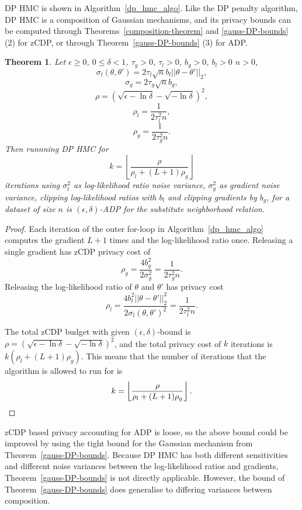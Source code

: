 \documentclass[english,twoside,openright]{HYgraduMLDS}
\newtheorem{theorem}[lemma]{Theorem}
\begin{document}
DP HMC is shown in Algorithm~\ref{dp_hmc_algo}.
Like the DP penalty algorithm, DP HMC is a composition of Gaussian mechanisms,
and its privacy bounds can be computed through Theorems~\ref{composition-theorem}
and \ref{gauss-DP-bounds} (2) for zCDP, or through Theorem~\ref{gauss-DP-bounds} (3)
for ADP.

\begin{theorem}\label{dp_hmc_theorem_zcdp}
  Let \(\epsilon \geq 0\), \(0 \leq \delta < 1\), \(\tau_{g} > 0\), \(\tau_{l} > 0\),
  \(b_{g} > 0\), \(b_{l} > 0\) \(n > 0\),
  \[\sigma_l(\theta, \theta') = 2\tau_l\sqrt{n}b_l||\theta - \theta'||_2,\]
  \[\sigma_g = 2\tau_g\sqrt{n}b_g,\]
  \[
    \rho = \left(\sqrt{\epsilon - \ln \delta} - \sqrt{-\ln \delta}\right)^2,
  \]
  \[
    \rho_l = \frac{1}{2\tau_l^2n},
  \]
  \[
    \rho_g = \frac{1}{2\tau_g^2n}.
  \]
  Then runnning DP HMC for
  \[
    k = \left\lfloor\frac{\rho}{\rho_l + (L + 1)\rho_g}\right\rfloor
  \]
  iterations using \(\sigma_{l}^{2}\) as log-likelihood ratio noise variance,
  \(\sigma_{g}^{2}\) as gradient noise variance, clipping log-likelihood ratios
  with \(b_{l}\) and clipping gradients by \(b_{g}\), for a dataset of size \(n\)
  is \((\epsilon, \delta)\)-ADP for the substitute neighborhood relation.
\end{theorem}
\begin{proof}
  Each iteration of the outer for-loop in Algorithm~\ref{dp_hmc_algo}
  computes the gradient \(L + 1\) times and
  the log-likelihood ratio once. Releasing a single gradient has zCDP privacy
  cost of
  \[
    \rho_g = \frac{4b_g^2}{2\sigma_g^2} = \frac{1}{2\tau_g^2n}.
  \]
  Releasing the log-likelihood ratio of \(\theta\) and \(\theta'\) has privacy cost
  \[
    \rho_l = \frac{4b_l^2||\theta - \theta'||_2^2}{2\sigma_l(\theta, \theta')^2} = \frac{1}{2\tau_l^2n}.
  \]

  The total zCDP budget with given \((\epsilon, \delta)\)-bound is
  \(\rho = \left(\sqrt{\epsilon - \ln \delta} - \sqrt{-\ln \delta}\right)^2\),
  and the total privacy cost of \(k\) iterations is \(k(\rho_{l} + (L + 1)\rho_{g})\).
  This means that the number of iterations that the algorithm is allowed to run for
  is
  \[
    k = \left\lfloor\frac{\rho}{\rho_l + (L + 1)\rho_g}\right\rfloor.
    \qedhere
  \]
\end{proof}

zCDP based privacy accounting for ADP is loose, so the above bound could be improved
by using the tight bound for the Gaussian mechanism from
Theorem~\ref{gauss-DP-bounds}. Because DP HMC has both
different sensitivities and different noise variances between the log-likelihood
ratios and gradients, Theorem~\ref{gauss-DP-bounds} is not directly applicable.
However, the bound of Theorem~\ref{gauss-DP-bounds} does generalise to differing
variances between composition.
\end{document}
